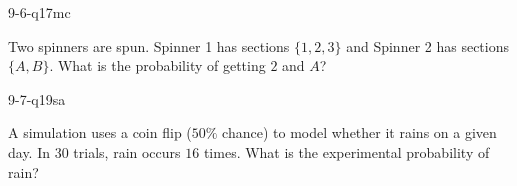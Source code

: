 \begin{practiceQuestion}{9-6-q17}{mc}
\begin{questionText}
Two spinners are spun. Spinner 1 has sections $\{1, 2, 3\}$ and Spinner 2 has sections $\{A, B\}$. What is the probability of getting $2$ and $A$?
\end{questionText}
\end{practiceQuestion}

\begin{practiceQuestion}{9-7-q19}{sa}
\begin{questionText}
A simulation uses a coin flip ($50\%$ chance) to model whether it rains on a given day. In $30$ trials, rain occurs $16$ times. What is the experimental probability of rain?
\end{questionText}
\end{practiceQuestion}
